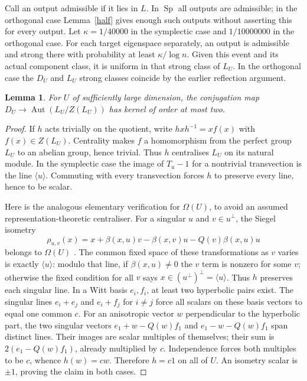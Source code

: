 \documentclass[11pt]{article}
\newtheorem{lemma}[theorem]{Lemma}
\newcommand{\Sp}{\operatorname{Sp}}
\newcommand{\Om}{\Omega}
\newcommand{\Aut}{\operatorname{Aut}}
\begin{document}
Call an output admissible if it lies in $L$. In $\Sp$ all outputs are admissible; in the orthogonal case Lemma~\ref{half} gives enough such outputs without asserting this for every output. Let $\kappa=1/40000$ in the symplectic case and $1/10000000$ in the orthogonal case. For each target eigenspace separately, an output is admissible and strong there with probability at least $\kappa/\log n$. Given this event and its actual component class, it is uniform in that strong class of $L_U$. In the orthogonal case the $D_U$ and $L_U$ strong classes coincide by the earlier reflection argument.

\begin{lemma}\label{kernel}
For $U$ of sufficiently large dimension, the conjugation map $D_U\longrightarrow\Aut(L_U/Z(L_U))$ has kernel of order at most two.
\end{lemma}
\begin{proof}
If $h$ acts trivially on the quotient, write $hxh^{-1}=x f(x)$ with $f(x)\in Z(L_U)$. Centrality makes $f$ a homomorphism from the perfect group $L_U$ to an abelian group, hence trivial. Thus $h$ centralises $L_U$ on its natural module. In the symplectic case the image of $T_u-1$ for a nontrivial transvection is the line $\langle u\rangle$. Commuting with every transvection forces $h$ to preserve every line, hence to be scalar.

Here is the analogous elementary verification for $\Om(U)$, to avoid an assumed representation-theoretic centraliser. For a singular $u$ and $v\in u^\perp$, the Siegel isometry
\[
\rho_{u,v}(x)=x+\beta(x,u)v-\beta(x,v)u-Q(v)\beta(x,u)u
\]
belongs to $\Om(U)$ \cite[Theorem~11.24]{taylor}. The common fixed space of these transformations as $v$ varies is exactly $\langle u\rangle$: modulo that line, if $\beta(x,u)\ne0$ the $v$ term is nonzero for some $v$; otherwise the fixed condition for all $v$ says $x\in(u^\perp)^\perp=\langle u\rangle$. Thus $h$ preserves each singular line. In a Witt basis $e_i,f_i$, at least two hyperbolic pairs exist. The singular lines $e_i+e_j$ and $e_i+f_j$ for $i\ne j$ force all scalars on these basis vectors to equal one common $c$. For an anisotropic vector $w$ perpendicular to the hyperbolic part, the two singular vectors $e_1+w-Q(w)f_1$ and $e_1-w-Q(w)f_1$ span distinct lines. Their images are scalar multiples of themselves; their sum is $2(e_1-Q(w)f_1)$, already multiplied by $c$. Independence forces both multiples to be $c$, whence $h(w)=cw$. Therefore $h=c1$ on all of $U$. An isometry scalar is $\pm1$, proving the claim in both cases.
\end{proof}
\end{document}

